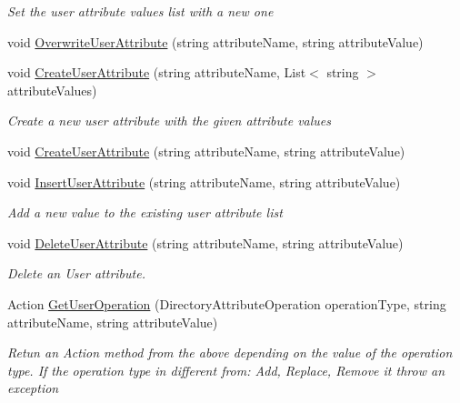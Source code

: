 \begin{DoxyCompactItemize}
\begin{DoxyCompactList}\small\item\em Set the user attribute values list with a new one \end{DoxyCompactList}\item 
void \hyperlink{interface_l_d_a_p_library_1_1_interfarces_1_1_i_ldap_user_a16acedbe659f578b4d2767e631362043}{Overwrite\+User\+Attribute} (string attribute\+Name, string attribute\+Value)
\item 
void \hyperlink{interface_l_d_a_p_library_1_1_interfarces_1_1_i_ldap_user_a240c54768b0de646b98b7f6971b42322}{Create\+User\+Attribute} (string attribute\+Name, List$<$ string $>$ attribute\+Values)
\begin{DoxyCompactList}\small\item\em Create a new user attribute with the given attribute values \end{DoxyCompactList}\item 
void \hyperlink{interface_l_d_a_p_library_1_1_interfarces_1_1_i_ldap_user_a6073df689eb89d446015432313ac35e8}{Create\+User\+Attribute} (string attribute\+Name, string attribute\+Value)
\item 
void \hyperlink{interface_l_d_a_p_library_1_1_interfarces_1_1_i_ldap_user_a9a5c6edf227442d352988d85ff6203dd}{Insert\+User\+Attribute} (string attribute\+Name, string attribute\+Value)
\begin{DoxyCompactList}\small\item\em Add a new value to the existing user attribute list \end{DoxyCompactList}\item 
void \hyperlink{interface_l_d_a_p_library_1_1_interfarces_1_1_i_ldap_user_ac2ec74cb853617c0d8199565b757d55c}{Delete\+User\+Attribute} (string attribute\+Name, string attribute\+Value)
\begin{DoxyCompactList}\small\item\em Delete an User attribute. \end{DoxyCompactList}\item 
Action \hyperlink{interface_l_d_a_p_library_1_1_interfarces_1_1_i_ldap_user_a761d7eb5b8ad8dc4eff77ecac9ffaafd}{Get\+User\+Operation} (Directory\+Attribute\+Operation operation\+Type, string attribute\+Name, string attribute\+Value)
\begin{DoxyCompactList}\small\item\em Retun an Action method from the above depending on the value of the operation type. If the operation type in different from\+: Add, Replace, Remove it throw an exception \end{DoxyCompactList}\end{DoxyCompactItemize}


